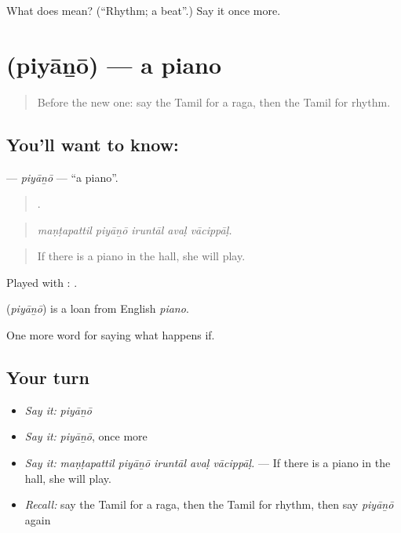 \begin{tcolorbox}[breakable,colback=teal!4,colframe=teal!35!black,title={Before you move on}]
What does  mean? (\textquotedblleft{}Rhythm; a beat\textquotedblright{}.) Say it once more.
\end{tcolorbox}
\section[\texorpdfstring{\ta{பியானோ} (piyāṉō)}{பியானோ (piyāṉō)}]{ (piyāṉō) — a piano}

\label{lesson:TA-C558-piyano}



\begin{quote}
Before the new one: say the Tamil for a raga, then the Tamil for rhythm.
\end{quote}

\subsection*{You'll want to know: }
\textbf{} — \emph{piyāṉō} — \textquotedblleft{}a piano\textquotedblright{}.

\begin{quote}
    .
\end{quote}

\begin{quote}
\emph{maṇṭapattil piyāṉō iruntāl avaḷ vācippāḷ.}
\end{quote}

\begin{quote}
If there is a piano in the hall, she will play.
\end{quote}

Played with :  .

\begin{cousinweb}
\textbf{} (\emph{piyāṉō}) is a loan from English \emph{piano}.
\end{cousinweb}

\begin{grammarlens}[title={What you've built}]
One more word for saying what happens if.
\end{grammarlens}

\subsection*{Your turn}
\begin{itemize}
\raggedright
  \item \emph{Say it:} \emph{piyāṉō}
  \item \emph{Say it:} \emph{piyāṉō}, once more
  \item \emph{Say it:} \emph{maṇṭapattil piyāṉō iruntāl avaḷ vācippāḷ.} — If there is a piano in the hall, she will play.
  \item \emph{Recall:} say the Tamil for a raga, then the Tamil for rhythm, then say \emph{piyāṉō} again
\end{itemize}

